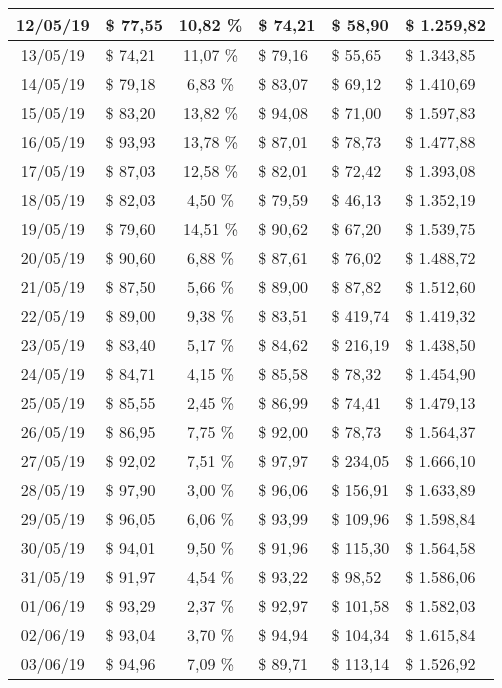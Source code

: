 \begin{center}
\begin{small}
\begin{longtable}{|c|l|c|l|l|l|}
12/05/19 & \$ 77,55 & 10,82 \% & \$ 74,21 & \$ 58,90 & \$ 1.259,82 \\ \hline
13/05/19 & \$ 74,21 & 11,07 \% & \$ 79,16 & \$ 55,65 & \$ 1.343,85 \\ \hline
14/05/19 & \$ 79,18 & 6,83 \% & \$ 83,07 & \$ 69,12 & \$ 1.410,69 \\ \hline
15/05/19 & \$ 83,20 & 13,82 \% & \$ 94,08 & \$ 71,00 & \$ 1.597,83 \\ \hline
16/05/19 & \$ 93,93 & 13,78 \% & \$ 87,01 & \$ 78,73 & \$ 1.477,88 \\ \hline
17/05/19 & \$ 87,03 & 12,58 \% & \$ 82,01 & \$ 72,42 & \$ 1.393,08 \\ \hline
18/05/19 & \$ 82,03 & 4,50 \% & \$ 79,59 & \$ 46,13 & \$ 1.352,19 \\ \hline
19/05/19 & \$ 79,60 & 14,51 \% & \$ 90,62 & \$ 67,20 & \$ 1.539,75 \\ \hline
20/05/19 & \$ 90,60 & 6,88 \% & \$ 87,61 & \$ 76,02 & \$ 1.488,72 \\ \hline
21/05/19 & \$ 87,50 & 5,66 \% & \$ 89,00 & \$ 87,82 & \$ 1.512,60 \\ \hline
22/05/19 & \$ 89,00 & 9,38 \% & \$ 83,51 & \$ 419,74 & \$ 1.419,32 \\ \hline
23/05/19 & \$ 83,40 & 5,17 \% & \$ 84,62 & \$ 216,19 & \$ 1.438,50 \\ \hline
24/05/19 & \$ 84,71 & 4,15 \% & \$ 85,58 & \$ 78,32 & \$ 1.454,90 \\ \hline
25/05/19 & \$ 85,55 & 2,45 \% & \$ 86,99 & \$ 74,41 & \$ 1.479,13 \\ \hline
26/05/19 & \$ 86,95 & 7,75 \% & \$ 92,00 & \$ 78,73 & \$ 1.564,37 \\ \hline
27/05/19 & \$ 92,02 & 7,51 \% & \$ 97,97 & \$ 234,05 & \$ 1.666,10 \\ \hline
28/05/19 & \$ 97,90 & 3,00 \% & \$ 96,06 & \$ 156,91 & \$ 1.633,89 \\ \hline
29/05/19 & \$ 96,05 & 6,06 \% & \$ 93,99 & \$ 109,96 & \$ 1.598,84 \\ \hline
30/05/19 & \$ 94,01 & 9,50 \% & \$ 91,96 & \$ 115,30 & \$ 1.564,58 \\ \hline
31/05/19 & \$ 91,97 & 4,54 \% & \$ 93,22 & \$ 98,52 & \$ 1.586,06 \\ \hline
01/06/19 & \$ 93,29 & 2,37 \% & \$ 92,97 & \$ 101,58 & \$ 1.582,03 \\ \hline
02/06/19 & \$ 93,04 & 3,70 \% & \$ 94,94 & \$ 104,34 & \$ 1.615,84 \\ \hline
03/06/19 & \$ 94,96 & 7,09 \% & \$ 89,71 & \$ 113,14 & \$ 1.526,92 \\ \hline

\end{longtable}
\end{small}
\end{center}
